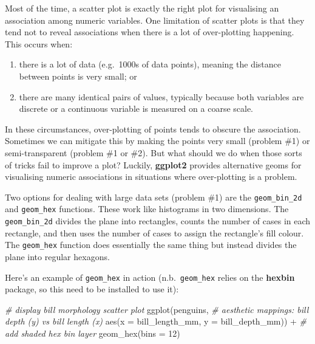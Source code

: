 \documentclass[
]{book}
\newenvironment{Shaded}{\begin{snugshade}}{\end{snugshade}}
\newcommand{\AttributeTok}[1]{\textcolor[rgb]{0.77,0.63,0.00}{#1}}
\newcommand{\CommentTok}[1]{\textcolor[rgb]{0.56,0.35,0.01}{\textit{#1}}}
\newcommand{\DecValTok}[1]{\textcolor[rgb]{0.00,0.00,0.81}{#1}}
\newcommand{\FunctionTok}[1]{\textcolor[rgb]{0.00,0.00,0.00}{#1}}
\newcommand{\NormalTok}[1]{#1}
\newcommand{\SpecialCharTok}[1]{\textcolor[rgb]{0.00,0.00,0.00}{#1}}
\providecommand{\tightlist}{%
  \setlength{\itemsep}{0pt}\setlength{\parskip}{0pt}}
\begin{document}
Most of the time, a scatter plot is exactly the right plot for visualising an association among numeric variables. One limitation of scatter plots is that they tend not to reveal associations when there is a lot of over-plotting happening. This occurs when:

\begin{enumerate}
\def\labelenumi{\arabic{enumi}.}
\tightlist
\item
  there is a lot of data (e.g.~1000s of data points), meaning the distance between points is very small; or
\item
  there are many identical pairs of values, typically because both variables are discrete or a continuous variable is measured on a coarse scale.
\end{enumerate}

In these circumstances, over-plotting of points tends to obscure the association. Sometimes we can mitigate this by making the points very small (problem \#1) or semi-transparent (problem \#1 or \#2). But what should we do when those sorts of tricks fail to improve a plot? Luckily, \textbf{ggplot2} provides alternative geoms for visualising numeric associations in situations where over-plotting is a problem.

Two options for dealing with large data sets (problem \#1) are the \texttt{geom\_bin\_2d} and \texttt{geom\_hex} functions. These work like histograms in two dimensions. The \texttt{geom\_bin\_2d} divides the plane into rectangles, counts the number of cases in each rectangle, and then uses the number of cases to assign the rectangle's fill colour. The \texttt{geom\_hex} function does essentially the same thing but instead divides the plane into regular hexagons.

Here's an example of \texttt{geom\_hex} in action (n.b.~\texttt{geom\_hex} relies on the \textbf{hexbin} package, so this need to be installed to use it):

\begin{Shaded}
\begin{Highlighting}[]
\CommentTok{\# display bill morphology scatter plot}
\FunctionTok{ggplot}\NormalTok{(penguins,}
       \CommentTok{\# aesthetic mappings: bill depth (y) vs bill length (x)}
       \FunctionTok{aes}\NormalTok{(}\AttributeTok{x =}\NormalTok{ bill\_length\_mm, }\AttributeTok{y =}\NormalTok{ bill\_depth\_mm)) }\SpecialCharTok{+} 
  \CommentTok{\# add shaded hex bin layer}
  \FunctionTok{geom\_hex}\NormalTok{(}\AttributeTok{bins =} \DecValTok{12}\NormalTok{)}
\end{Highlighting}
\end{Shaded}
\end{document}
